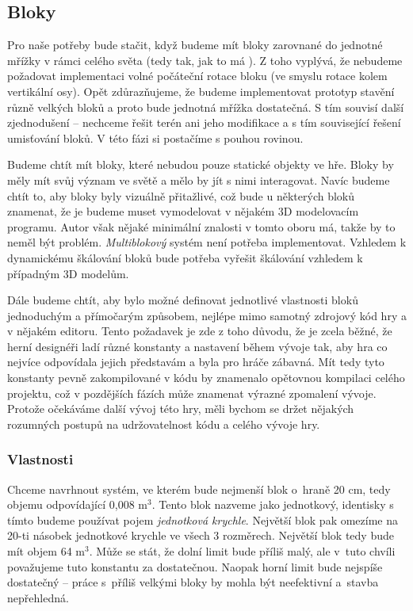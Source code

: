 
\subsection{Bloky}

Pro naše potřeby bude stačit, když budeme mít bloky zarovnané do jednotné mřížky v rámci celého světa (tedy tak, jak to má \MC{}).  Z toho vyplývá, že nebudeme požadovat implementaci volné počáteční rotace bloku (ve smyslu rotace kolem vertikální osy). Opět zdůrazňujeme, že budeme implementovat prototyp stavění různě velkých bloků a proto bude jednotná mřížka dostatečná. S tím souvisí další zjednodušení -- nechceme řešit terén ani jeho modifikace a s tím související řešení umisťování bloků. V této fázi si postačíme s pouhou rovinou.


Budeme chtít mít bloky, které nebudou pouze statické objekty ve hře. Bloky by měly mít svůj význam ve světě a mělo by jít s nimi interagovat. Navíc budeme chtít to, aby bloky byly vizuálně přitažlivé, což bude u některých bloků znamenat, že je budeme muset vymodelovat v nějakém 3D modelovacím programu. Autor však nějaké minimální znalosti v tomto oboru má, takže by to neměl být problém. \textit{Multiblokový} systém není potřeba implementovat. Vzhledem k dynamickému škálování bloků bude potřeba vyřešit škálování vzhledem k případným 3D modelům. 


Dále budeme chtít, aby bylo možné definovat jednotlivé vlastnosti bloků jednoduchým a přímočarým způsobem, nejlépe mimo samotný zdrojový kód hry a v nějakém editoru. Tento požadavek je zde z toho důvodu, že je zcela běžné, že herní designéři ladí různé konstanty a nastavení během vývoje tak, aby hra co nejvíce odpovídala jejich představám a byla pro hráče zábavná. Mít tedy tyto konstanty pevně zakompilované v kódu by znamenalo opětovnou kompilaci celého projektu, což v pozdějších fázích může znamenat výrazné zpomalení vývoje. Protože očekáváme další vývoj této hry, měli bychom se držet nějakých rozumných postupů na udržovatelnost kódu a celého vývoje hry.

\subsubsection{Vlastnosti}

Chceme navrhnout systém, ve kterém bude nejmenší blok o~hraně 20 cm, tedy objemu odpovídající 0,008 m$^3$. Tento blok nazveme jako jednotkový, identisky s tímto budeme používat pojem \textit{jednotková krychle}. Největší blok pak omezíme na 20-ti násobek jednotkové krychle ve všech 3 rozměrech. Největší blok tedy bude mít objem 64 m$^3$. Může se stát, že dolní limit bude příliš malý, ale v~tuto chvíli považujeme tuto konstantu za dostatečnou. Naopak horní limit bude nejspíše dostatečný -- práce s~příliš velkými bloky by mohla být neefektivní a~stavba nepřehledná.

